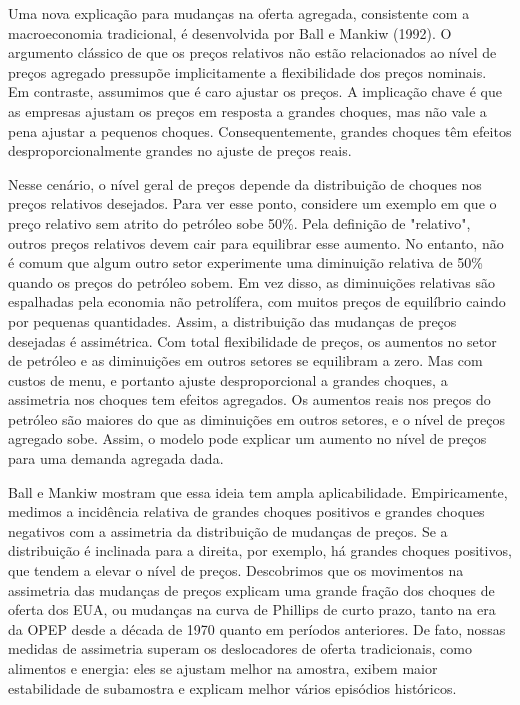 \documentclass[a4paper,12pt]{article}[abntex2]
\begin{document}
Uma nova explicação para mudanças na oferta agregada, consistente com a macroeconomia tradicional, é desenvolvida por Ball e Mankiw (1992). O argumento clássico de que os preços relativos não estão relacionados ao nível de preços agregado pressupõe implicitamente a flexibilidade dos preços nominais. Em contraste, assumimos que é caro ajustar os preços. A implicação chave é que as empresas ajustam os preços em resposta a grandes choques, mas não vale a pena ajustar a pequenos choques. Consequentemente, grandes choques têm efeitos desproporcionalmente grandes no ajuste de preços reais.

Nesse cenário, o nível geral de preços depende da distribuição de choques nos preços relativos desejados. Para ver esse ponto, considere um exemplo em que o preço relativo sem atrito do petróleo sobe 50\%. Pela definição de "relativo", outros preços relativos devem cair para equilibrar esse aumento. No entanto, não é comum que algum outro setor experimente uma diminuição relativa de 50\% quando os preços do petróleo sobem. Em vez disso, as diminuições relativas são espalhadas pela economia não petrolífera, com muitos preços de equilíbrio caindo por pequenas quantidades. Assim, a distribuição das mudanças de preços desejadas é assimétrica. Com total flexibilidade de preços, os aumentos no setor de petróleo e as diminuições em outros setores se equilibram a zero. Mas com custos de menu, e portanto ajuste desproporcional a grandes choques, a assimetria nos choques tem efeitos agregados. Os aumentos reais nos preços do petróleo são maiores do que as diminuições em outros setores, e o nível de preços agregado sobe. Assim, o modelo pode explicar um aumento no nível de preços para uma demanda agregada dada.

Ball e Mankiw mostram que essa ideia tem ampla aplicabilidade. Empiricamente, medimos a incidência relativa de grandes choques positivos e grandes choques negativos com a assimetria da distribuição de mudanças de preços. Se a distribuição é inclinada para a direita, por exemplo, há grandes choques positivos, que tendem a elevar o nível de preços. Descobrimos que os movimentos na assimetria das mudanças de preços explicam uma grande fração dos choques de oferta dos EUA, ou mudanças na curva de Phillips de curto prazo, tanto na era da OPEP desde a década de 1970 quanto em períodos anteriores. De fato, nossas medidas de assimetria superam os deslocadores de oferta tradicionais, como alimentos e energia: eles se ajustam melhor na amostra, exibem maior estabilidade de subamostra e explicam melhor vários episódios históricos.
\end{document}
